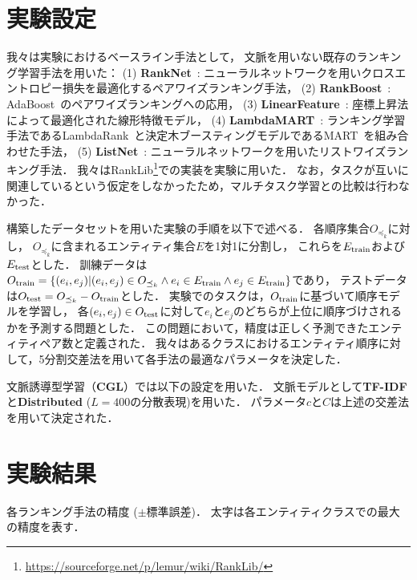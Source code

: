 \section{実験設定}

我々は実験におけるベースライン手法として，
文脈を用いない既存のランキング学習手法を用いた：
(1) {\bf RankNet}~\cite{burges2005learning}: ニューラルネットワークを用いクロスエントロピー損失を最適化するペアワイズランキング手法，
(2) {\bf RankBoost}~\cite{freund2003efficient}: AdaBoost~\cite{freund1997decision}のペアワイズランキングへの応用，
(3) {\bf LinearFeature}~\cite{metzler2007linear}: 座標上昇法によって最適化された線形特徴モデル，
(4) {\bf LambdaMART}~\cite{wu2010adapting}: ランキング学習手法であるLambdaRank~\cite{burges2006learning}と決定木ブースティングモデルであるMART~\cite{friedman2001greedy}を組み合わせた手法，
(5) {\bf ListNet}~\cite{cao2007learning}: ニューラルネットワークを用いたリストワイズランキング手法．
我々はRankLib\footnote{\url{https://sourceforge.net/p/lemur/wiki/RankLib/}}での実装を実験に用いた．
なお，タスクが互いに関連しているという仮定をしなかったため，マルチタスク学習との比較は行わなかった．

構築したデータセットを用いた実験の手順を以下で述べる．
各順序集合$O_{\preceq_{k}}$に対し，
$O_{\preceq_{k}}$に含まれるエンティティ集合$E$を1対1に分割し，
これらを$E_{\rm train}$および$E_{\rm test}$とした．
訓練データは$O_{\rm train} = \{(e_i, e_j) | (e_i, e_j) \in O_{\preceq_{k}} \wedge e_i \in E_{\rm train} \wedge e_j \in E_{\rm train} \}$であり，
テストデータは$O_{\rm test} = O_{\preceq_{k}} - O_{\rm train}$とした．
実験でのタスクは，$O_{\rm train}$に基づいて順序モデルを学習し，
各$(e_i, e_j) \in O_{\rm test}$に対して$e_i$と$e_j$のどちらが上位に順序づけされるかを予測する問題とした．
この問題において，精度は正しく予測できたエンティティペア数と定義された．
我々はあるクラスにおけるエンティティ順序に対して，5分割交差法を用いて各手法の最適なパラメータを決定した．

文脈誘導型学習（{\bf CGL}）では以下の設定を用いた．
文脈モデルとして{\bf TF-IDF}と{\bf Distributed} ($L=400$の分散表現)を用いた．
パラメータ$c$と$C$は上述の交差法を用いて決定された．

\section{実験結果}

\begin{table}[t]
\centering
\caption{各ランキング手法の精度 ($\pm$標準誤差)．
太字は各エンティティクラスでの最大の精度を表す．}

\label{tb:real_data_results}
\end{table}

